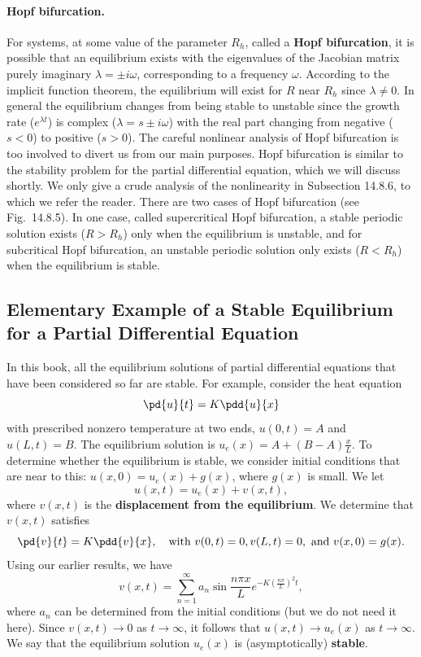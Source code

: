 \paragraph{Hopf bifurcation.}
For systems, at some value of the parameter $R_h$, called a \textbf{Hopf bifurcation}, it is possible that an equilibrium exists with the eigenvalues of the Jacobian matrix purely imaginary $\lambda = \pm i\omega$, corresponding to a frequency $\omega$. According to the implicit function theorem, the equilibrium will exist for $R$ near $R_h$ since $\lambda \neq 0$. In general the equilibrium changes from being stable to unstable since the growth rate ($e^{\lambda t}$) is complex ($\lambda = s \pm i\omega$) with the real part changing from negative ($s < 0$) to positive ($s > 0$). The careful nonlinear analysis of Hopf bifurcation is too involved to divert us from our main purposes. Hopf bifurcation is similar to the stability problem for the partial differential equation, which we will discuss shortly. We only give a crude analysis of the nonlinearity in Subsection 14.8.6, to which we refer the reader. There are two cases of Hopf bifurcation (see Fig.\ 14.8.5). In one case, called supercritical Hopf bifurcation, a stable periodic solution exists ($R > R_h$) only when the equilibrium is unstable, and for subcritical Hopf bifurcation, an unstable periodic solution only exists ($R < R_h$) when the equilibrium is stable.

\subsection{Elementary Example of a Stable Equilibrium for a Partial Differential Equation}
\label{subsec:14.8.2}

In this book, all the equilibrium solutions of partial differential equations that have been considered so far are stable. For example, consider the heat equation
\[
\pd{u}{t} = K\pdd{u}{x}
\]
with prescribed nonzero temperature at two ends, $u(0,t) = A$ and $u(L,t) = B$. The equilibrium solution is $u_e(x) = A + (B-A)\frac{x}{L}$. To determine whether the equilibrium is stable, we consider initial conditions that are near to this: $u(x,0) = u_e(x) + g(x)$, where $g(x)$ is small. We let
\[
u(x,t) = u_e(x) + v(x,t),
\]
where $v(x,t)$ is the \textbf{displacement from the equilibrium}. We determine that $v(x,t)$ satisfies
\[
\pd{v}{t} = K\pdd{v}{x}, \quad \text{with } v(0,t) = 0, v(L,t) = 0, \text{ and } v(x,0) = g(x).
\]
Using our earlier results, we have
\[
v(x,t) = \sum_{n=1}^{\infty} a_n \sin\frac{n\pi x}{L} e^{-K(\frac{n\pi}{L})^2 t},
\]
where $a_n$ can be determined from the initial conditions (but we do not need it here). Since $v(x,t) \to 0$ as $t \to \infty$, it follows that $u(x,t) \to u_e(x)$ as $t \to \infty$. We say that the equilibrium solution $u_e(x)$ is (asymptotically) \textbf{stable}.

